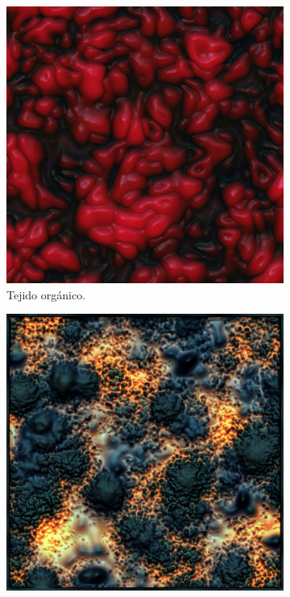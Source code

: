 \begin{figure}[H]
    \begin{center}
        \begin{subfigure}[b]{0.3\textwidth}
            \centering
            \includegraphics[scale=0.164]{img/redPerlin.png}
            \caption{Tejido orgánico.}
        \end{subfigure}
        \hfill
        \begin{subfigure}[b]{0.3\textwidth}
            \centering
            \includegraphics[scale=0.2305]{img/lavaPerlin.jpg}

\end{subfigure}
\end{center}
\end{figure}
